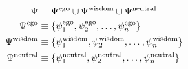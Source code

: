 \begin{align}
    \Psi &\equiv \Psi^{\mathrm{ego}} \cup \Psi^{\mathrm{wisdom}} \cup \Psi^{\mathrm{neutral}} \\
    \Psi^{\mathrm{ego}}     &\equiv \{\psi^{\mathrm{ego}}_1, \psi^{\mathrm{ego}}_2, \dots, \psi^{\mathrm{ego}}_n\} \\
    \Psi^{\mathrm{wisdom}}  &\equiv \{\psi^{\mathrm{wisdom}}_1, \psi^{\mathrm{wisdom}}_2, \dots, \psi^{\mathrm{wisdom}}_n\} \\
    \Psi^{\mathrm{neutral}} &\equiv \{\psi^{\mathrm{neutral}}_1, \psi^{\mathrm{neutral}}_2, \dots, \psi^{\mathrm{neutral}}_n\}
\end{align}



